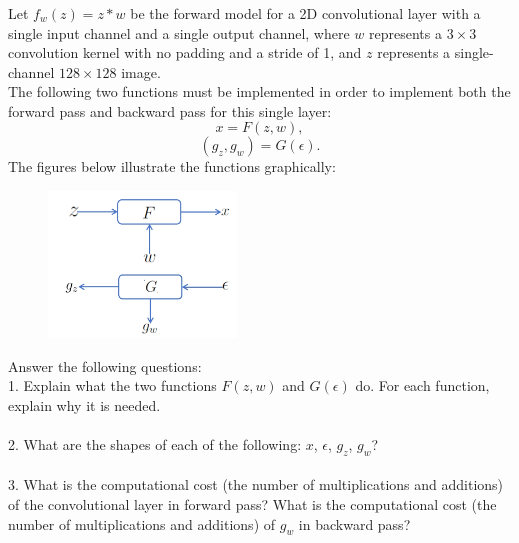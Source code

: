 \documentclass[12pt]{article}%
\begin{document}
\subsubsection*{}
Let $f_w(z)=z*w$ be the forward model for a 2D convolutional layer with a single input channel and a single 
output channel, where $w$ represents a 
$3\times3$ convolution kernel with no padding and a stride of 1, and 
$z$ represents a single-channel $128\times128$ image. \\
The following two functions must be implemented in order to implement 
both the forward pass and backward pass for this single layer:
$$x = F(z, w),$$
$$(g_z, g_w) = G(\epsilon).$$
The figures below illustrate the functions graphically:
\begin{figure}[htbp]
    \centering
    \includegraphics[width=5cm]{examp.png}
\end{figure}

\noindent Answer the following questions:
\vspace{0.5em}
\\
1. Explain what the two functions $F(z, w)$ and $G(\epsilon)$ do. For each function, explain why it is needed. 
\\\\   
2. What are the shapes of each of the following: $x$, $\epsilon$, $g_z$, $g_w$? 
\\\\
3. What is the computational cost (the number of multiplications and additions) of the convolutional layer in forward pass? What is the computational cost (the number of multiplications and additions) of $g_w$ in backward pass?

\newpage


\end{document}
